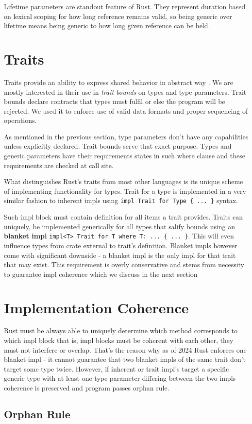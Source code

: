 Lifetime parameters are standout feature of Rust. They represent duration based on lexical scoping for how long reference remains valid, so being generic over lifetime means being generic
to how long given reference can be held.

\section{Traits}

Traits provide an ability to express shared behavior in abstract way \cite{rustbook}. We are mostly interested in their use in \textit{trait bounds} on types and type parameters.
Trait bounds declare contracts that types must fulfil or else the program will be rejected. 
We used it to enforce use of valid data formats and proper sequencing of operations.

As mentioned in the previous section, type parameters don't have any capabilities unless explicitly declared. Trait bounds serve that exact purpose.
Types and generic parameters have their requirements states in such where clause and these requirements are checked at call site.

What distinguishes Rust's traits from most other languages is its unique scheme of implementing functionality for types.
Trait for a type is implemented in a very similar fashion to inherent impls using \texttt{impl Trait for Type \{ ... \}} syntax.

Such impl block must contain definition for all items a trait provides.
Traits can uniquely, be implemented generically for all types that salify bounds using an \textbf{blanket impl} \texttt{impl<T> Trait for T where T: ... \{ ... \}}.
This will even influence types from crate external to trait's definition. Blanket impls however come with significant downside - a blanket impl is the only impl for that trait that may exist.
This requirement is overly conservative and stems from necessity to guarantee impl coherence which we discuss in the next section

\section{Implementation Coherence}

Rust must be always able to uniquely determine which method corresponds to which impl block that is, impl blocks must be coherent with each other, they must not interfere or overlap.
That's the reason why as of 2024 Rust enforces one blanket impl - it cannot guarantee that two blanket impls of the same trait don't target some type twice.
However, if inherent or trait impl's target a specific generic type with at least one type parameter differing between the two impls coherence is preserved and program passes orphan rule.   


\subsection{Orphan Rule}